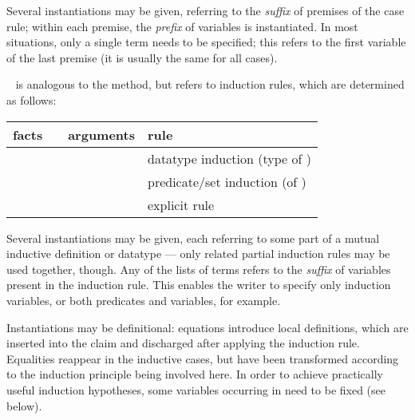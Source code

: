 \begin{isabellebody}
\begin{isamarkuptext}
\begin{description}
  Several instantiations may be given, referring to the \emph{suffix}
  of premises of the case rule; within each premise, the \emph{prefix}
  of variables is instantiated.  In most situations, only a single
  term needs to be specified; this refers to the first variable of the
  last premise (it is usually the same for all cases).

  \item \hyperlink{method.induct}{\mbox{}}~ is analogous to the
  \hyperlink{method.cases}{\mbox{}} method, but refers to induction rules, which are
  determined as follows:

  \medskip
  \begin{tabular}{llll}
    facts           &                  & arguments            & rule \\\hline
                    & \hyperlink{method.induct}{\mbox{\isa{induct}}} & \isa{{\isachardoublequote}P\ x{\isachardoublequote}}        & datatype induction (type of \isa{x}) \\
    \isa{{\isachardoublequote}{\isasymturnstile}\ A\ x{\isachardoublequote}} & \hyperlink{method.induct}{\mbox{\isa{induct}}} & \isa{{\isachardoublequote}{\isasymdots}{\isachardoublequote}}          & predicate/set induction (of \isa{A}) \\
    \isa{{\isachardoublequote}{\isasymdots}{\isachardoublequote}}     & \hyperlink{method.induct}{\mbox{\isa{induct}}} & \isa{{\isachardoublequote}{\isasymdots}\ rule{\isacharcolon}\ R{\isachardoublequote}} & explicit rule \isa{R} \\
  \end{tabular}
  \medskip
  
  Several instantiations may be given, each referring to some part of
  a mutual inductive definition or datatype --- only related partial
  induction rules may be used together, though.  Any of the lists of
  terms  refers to the \emph{suffix} of variables
  present in the induction rule.  This enables the writer to specify
  only induction variables, or both predicates and variables, for
  example.
  
  Instantiations may be definitional: equations 
  introduce local definitions, which are inserted into the claim and
  discharged after applying the induction rule.  Equalities reappear
  in the inductive cases, but have been transformed according to the
  induction principle being involved here.  In order to achieve
  practically useful induction hypotheses, some variables occurring in
   need to be fixed (see below).
  

\end{description}
\end{isamarkuptext}
\end{isabellebody}
